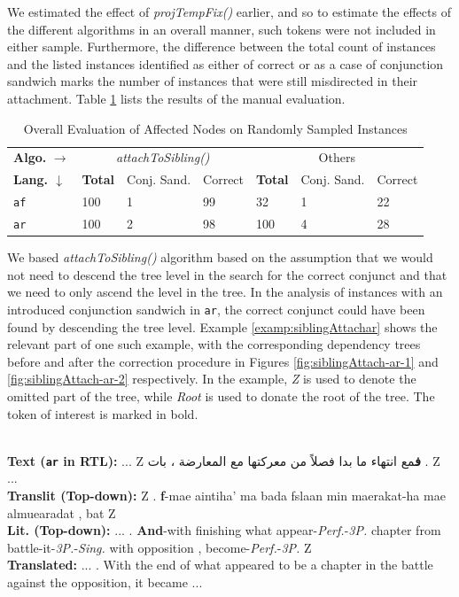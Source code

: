 We estimated the effect of \textit{projTempFix()} earlier, and so to estimate the effects of the different algorithms in an overall manner, such tokens were not included in either sample. Furthermore, the difference between the total count of instances and the listed instances identified as either of correct or as a case of conjunction sandwich marks the number of instances that were still misdirected in their attachment. Table \ref{tab:evalOverall} lists the results of the manual evaluation.

\begin{table}[H]
    \centering
    \begin{tabular}{|l|l|l|l|l|l|l|}
    \hline
    \multicolumn{1}{|l|}{\textbf{Algo.} $\rightarrow$} &
    \multicolumn{3}{c|}{\textit{attachToSibling()}} &
    \multicolumn{3}{c|}{Others}\\
    \textbf{Lang. $\downarrow$} & \textbf{Total} & Conj. Sand. & Correct & \textbf{Total} & Conj. Sand. & Correct\\
    \hline
    \texttt{af} & 100 & 1 & 99 & 32 & 1 & 22\\
    \texttt{ar} & 100 & 2 & 98 & 100 & 4 & 28\\
    \hline
    \end{tabular}
    \caption{Overall Evaluation of Affected Nodes on Randomly Sampled Instances}
    \label{tab:evalOverall}
\end{table}

We based \textit{attachToSibling()} algorithm based on the assumption that we would not need to descend the tree level in the search for the correct conjunct and that we need to only ascend the level in the tree. In the analysis of instances with an introduced conjunction sandwich in \verb|ar|, the correct conjunct could have been found by descending the tree level. Example \ref{examp:siblingAttachar} shows the relevant part of one such example, with the corresponding dependency trees before and after the correction procedure in Figures \ref{fig:siblingAttach-ar-1} and \ref{fig:siblingAttach-ar-2} respectively. In the example, \textit{Z} is used to denote the omitted part of the tree, while \textit{Root} is used to donate the root of the tree. The token of interest is marked in bold.

\begin{example}
\label{examp:siblingAttachar}
\textbf{ }\\
\textbf{Text (\texttt{ar} in RTL):} ... Z \textarabic{
\textbf{ف}مع  انتهاء   ما بدا فصلاً من معركتها مع المعارضة ، بات }
. Z ...\\
\textbf{Translit (Top-down):} Z . \textbf{f}-mae aintiha' ma bada fslaan min maerakat-ha mae almuearadat , bat Z\\
\textbf{Lit. (Top-down):} ... . \textbf{And}-with finishing what appear-\textit{Perf.}-\textit{3P.} chapter from battle-it-\textit{3P.}-\textit{Sing.} with opposition , become-\textit{Perf.}-\textit{3P.} Z\\
\textbf{Translated:} ... . With the end of what appeared to be a chapter in the battle against the opposition, it became ...  
\end{example}

